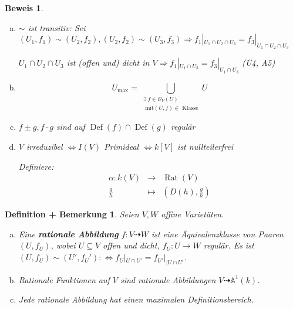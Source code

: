 \documentclass[a4paper, 12pt, numbers=noendperiod, chapterprefix=true]{scrbook}
\theoremstyle{break}
\newtheorem{DefBem}[Def]{Definition + Bemerkung}
\theoremstyle{nonumberbreak}
\newtheorem{Bew}{Beweis}
\theoremstyle{nonumberplain}
\newcommand{\emp}[1]{\textbf{\emph{#1}}}
\newcommand{\deftermspec}[2]{{\index{#2}}\emp{#1}}
\DeclareMathOperator{\Ddef}{Def}%
\DeclareMathOperator{\Rat}{Rat}
\newcommand{\calO}{\mathcal{O}}
\begin{document}
\begin{Bew}\begin{enumerate}[a)]
\item
	$\sim$ ist transitiv: Sei $(U_1,f_1)\sim(U_2,f_2), (U_2,f_2)\sim(U_3,f_3) \Rightarrow f_1|_{U_1\cap U_2\cap U_3}=f_3|_{U_1\cap U_2\cap U_3}$
	
	$U_1\cap U_2 \cap U_3$ ist (offen und) \emph{dicht} in $V \Rightarrow f_1|_{U_1\cap U_3} = f_3|_{U_1\cap U_3}$ (\"U4, A5)
\item
	\[U_{\max}=\bigcup_{\substack{\exists\ f\in \calO_V(U)\\ \textrm{ mit} (U,f)\in \textrm{ Klasse}}} U\]
\item
	$f\pm g, f\cdot g$ sind auf $\Ddef(f)\cap\Ddef(g)$ regul\"ar
\item
	$V$ irreduzibel $\Leftrightarrow I(V)$ Primideal $\Leftrightarrow k[V]$ ist nullteilerfrei
	
	\emph{Definiere:}\[\begin{array}{rcl}
		\alpha:k(V) &\to& \Rat(V)\\
		\frac{g}{h} &\mapsto& (D(h),\frac{g}{h})\end{array}\]
	\end{enumerate}\end{Bew}

\begin{DefBem}\label{bem7.2}
Seien $V,W$ affine Variet\"aten.\begin{enumerate}[a)]
\item
	Eine \deftermspec{rationale Abbildung}{Abbildung!rationale-} $f:V\dashrightarrow W$ ist eine \"Aquivalenzklasse von Paaren $(U,f_U)$, wobei $U\subseteq V$ offen und dicht, $f_U:U\longrightarrow W$ regul\"ar. Es ist $(U,f_U)\sim (U',f_U'):\Leftrightarrow f_U|_{U\cap U'}=f_{U'}|_{\vert U\cap U'}$.
\item
	Rationale Funktionen auf $V$ sind rationale Abbildungen $V\dashrightarrow \mathbb A^1(k)$.
\item
	Jede rationale Abbildung hat einen maximalen Definitionsbereich.
\end{enumerate}\end{DefBem}
\end{document}
